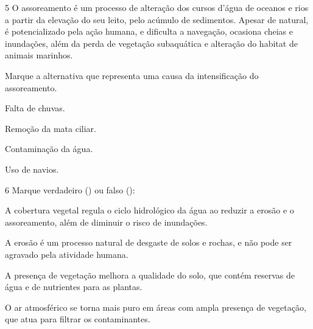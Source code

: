 \pagebreak
\num{5}
O assoreamento é um processo de alteração dos cursos
d'água de oceanos e rios a partir da elevação do seu leito, pelo acúmulo
de sedimentos. Apesar de natural, é potencializado pela ação humana, e
dificulta a navegação, ocasiona cheias e inundações, além da perda de
vegetação subaquática e alteração do habitat de animais marinhos.

Marque a alternativa que representa uma causa da intensificação do
assoreamento.

\begin{escolha}
\item Falta de chuvas.

\item Remoção da mata ciliar. 

\item Contaminação da água.

\item Uso de navios.
\end{escolha}

\num{6} Marque verdadeiro () ou falso ():

\begin{boxlist}
 A cobertura vegetal regula o ciclo hidrológico da água ao reduzir 
a erosão e o assoreamento, além de diminuir o risco de inundações.

 A erosão é um processo natural de desgaste de solos e rochas, e 
não pode ser agravado pela atividade humana.

 A presença de vegetação melhora a qualidade do solo, que contém 
reservas de água e de nutrientes para as plantas.

 O ar atmosférico se torna mais puro em áreas com ampla presença de 
vegetação, que atua para filtrar os contaminantes.
\end{boxlist}


